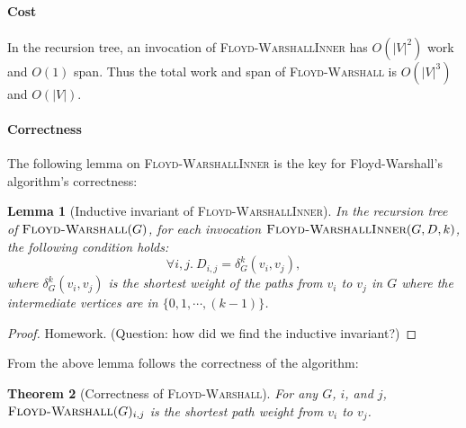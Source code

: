 \documentclass[11pt,a4paper,oneside,microtype,nokorean]{oblivoir}
\newtheorem{theorem}{Theorem}
\newtheorem{lemma}[theorem]{Lemma}
\begin{document}
\paragraph{Cost}

In the recursion tree, an invocation of \textsc{Floyd-WarshallInner} has $O(|V|^2)$ work and $O(1)$
span.  Thus the total work and span of \textsc{Floyd-Warshall} is $O(|V|^3)$ and $O(|V|)$.


\paragraph{Correctness} The following lemma on \textsc{Floyd-WarshallInner} is the key for
Floyd-Warshall's algorithm's correctness:

\begin{lemma}[Inductive invariant of \textsc{Floyd-WarshallInner}] In the recursion tree of
  $\textsc{Floyd-Warshall}(G)$, for each invocation $\textsc{Floyd-WarshallInner}(G,D,k)$, the
  following condition holds:
  \[ \forall i,j.~D_{i,j} = \delta_G^k(v_i,v_j),
  \]
  where $\delta_G^k(v_i,v_j)$ is the shortest weight of the paths from $v_i$ to $v_j$ in $G$ where
  the intermediate vertices are in $\{0,1,\cdots,(k-1)\}$.
\end{lemma}
\begin{proof}
  Homework.  (Question: how did we find the inductive invariant?)
\end{proof}

From the above lemma follows the correctness of the algorithm:

\begin{theorem}[Correctness of \textsc{Floyd-Warshall}] For any $G$, $i$, and $j$,
  $\textsc{Floyd-Warshall}(G)_{i,j}$ is the shortest path weight from $v_i$ to $v_j$.
\end{theorem}
\end{document}
